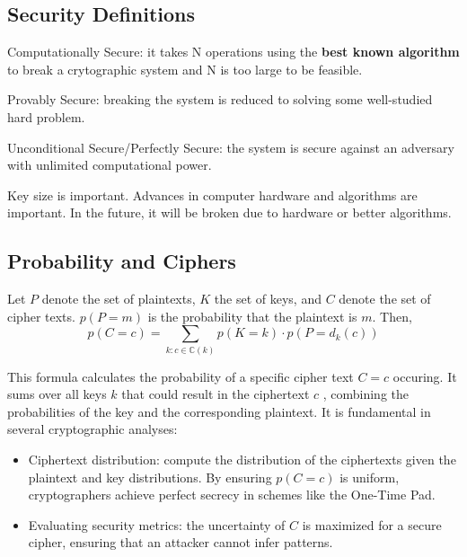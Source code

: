 \subsection{Security Definitions}
\begin{defn}
    Computationally Secure: it takes N operations using the \textbf{best known algorithm} to break a crytographic system and N is too large to be feasible.
\end{defn}

\begin{defn}
    Provably Secure: breaking the system is reduced to solving some well-studied hard problem.
\end{defn}

\begin{defn}
    Unconditional Secure/Perfectly Secure: the system is secure against an adversary with unlimited computational power.
\end{defn}

Key size is important. Advances in computer hardware and algorithms are important. In the future, it will be broken due to hardware or better algorithms.

\subsection{Probability and Ciphers}

\begin{defn}
Let $P$ denote the set of plaintexts, $K$ the set of keys, and $C$ denote the set of cipher texts. $p(P=m)$ is the probability that the plaintext is $m$. Then,
\[
p(C=c) = \sum_{k: c\in \mathbb{C}(k)} p(K=k)\cdot p(P=d_k(c))
\]
\end{defn}

This formula calculates the probability of a specific cipher text $C = c$ occuring. It sums over all keys $k$ that could result in the ciphertext $c$ , combining the probabilities of the key and the corresponding plaintext. It is fundamental in several cryptographic analyses:
\begin{itemize}
    \item Ciphertext distribution: compute the distribution of the ciphertexts given the plaintext and key distributions. By ensuring $p(C=c)$ is uniform, cryptographers achieve perfect secrecy in schemes like the One-Time Pad.
    \item Evaluating security metrics: the uncertainty of $C$ is maximized for a secure cipher, ensuring that an attacker cannot infer patterns.
\end{itemize}



